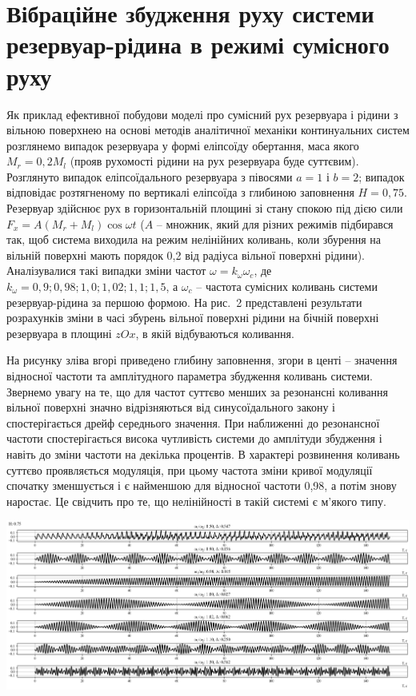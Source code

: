 \documentclass[11pt, reqno]{amsart}
\begin{document}


\section{Вібраційне збудження руху системи резервуар-рідина в режимі сумісного руху}
Як приклад ефективної побудови моделі про сумісний рух резервуара і рідини з вільною поверхнею на основі методів аналітичної механіки континуальних систем розглянемо випадок резервуара у формі еліпсоїду обертання, маса якого $M_r=0,2 M_l$ (прояв рухомості рідини на рух резервуара буде суттєвим). Розглянуто випадок еліпсоїдального резервуара з півосями $a=1$ і $b=2$; випадок   відповідає розтягненому по вертикалі еліпсоїда з глибиною заповнення $H=0,75$. Резервуар здійснює рух в горизонтальній площині зі стану спокою під дією сили $F_x = A(M_r+M_l) \cos \omega t$ ($A$ -- множник, який для різних режимів підбирався так, щоб система виходила на режим нелінійних коливань, коли збурення на вільній поверхні мають порядок 0,2 від радіуса вільної поверхні рідини). Аналізувалися такі випадки зміни частот  $\omega=k_\omega \omega_c$, де $k_\omega=0,9; 0,98; 1,0; 1,02; 1,1; 1,5$, а $\omega_c$ -- частота сумісних коливань системи резервуар-рідина за першою формою. На рис.~2 представлені результати розрахунків зміни в часі збурень вільної поверхні рідини на бічній поверхні резервуара в площині $zOx$, в якій відбуваються коливання.

На рисунку зліва вгорі приведено глибину заповнення, згори в центі -- значення відносної частоти та амплітудного параметра збудження коливань системи. Звернемо увагу на те, що для частот суттєво менших за резонансні коливання вільної поверхні значно відрізняються від синусоїдального закону і спостерігається дрейф середнього значення. При наближенні до резонансної частоти спостерігається висока чутливість системи до амплітуди збудження і навіть до зміни частоти на декілька процентів. В характері розвинення коливань суттєво проявляється модуляція, при цьому частота зміни кривої модуляції спочатку зменшується і є найменшою для відносної частоти 0,98, а потім знову наростає. Це свідчить про те, що нелінійності в такій системі є м'якого типу.


\hspace{-1.85cm}
\includegraphics[width=1.22\linewidth]{ger_2.eps}
\end{document}
